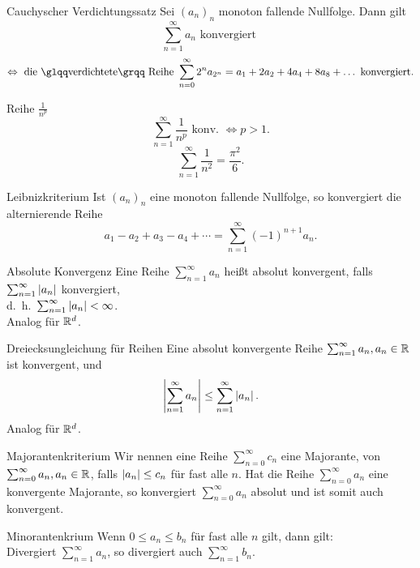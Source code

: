 \documentclass[main.tex]{subfiles}
\begin{document}
\begin{karte}{Cauchyscher Verdichtungssatz}
    Sei \({(a_n)}_n\) monoton fallende 
    Nullfolge. Dann gilt
    \[\sum_{n=1}^{\infty} a_n 
    \text{ konvergiert }\]
    \[\Leftrightarrow \text{ die 
    \gqq{verdichtete} Reihe } 
    \sum_{n=0}^{\infty}2^n a_{2^n} 
    = a_1 + 2a_2 + 4a_4 + 8 a_8 
    + \dots \text{ konvergiert}.\]
\end{karte}
\begin{karte}{Reihe \( \frac{1}{n^p} \)}
    \[ \sum_{n=1}^{\infty} 
    \frac{1}{n^p} \text{ konv. } 
    \Leftrightarrow p>1. \]
    \[ \sum_{n=1}^{\infty} \frac{1}{n^2} 
    = \frac{\pi^2}{6}. \]
\end{karte}
\begin{karte}{Leibnizkriterium}
    Ist \( {(a_n)}_n \) eine monoton 
    fallende Nullfolge, so konvergiert 
    die alternierende Reihe
    \[ a_1 - a_2 + a_3 - a_4 + \cdots 
    = \sum_{n=1}^{\infty} {(-1)}^{n+1} a_n. \]
\end{karte}
\begin{karte}{Absolute Konvergenz}
    Eine Reihe \( \sum_{n=1}^{\infty} a_n \) 
    heißt absolut konvergent, falls 
    \( \sum_{n=1}^{\infty} \left| a_n \right| \) 
    konvergiert,\\ 
    d.\ h.\  \(\sum_{n=1}^{\infty} \left| a_n \right| < \infty \).\\
    Analog für \(\mathbb{R}^d\).
\end{karte}
\begin{karte}{Dreiecksungleichung für Reihen}
    Eine absolut konvergente Reihe 
    \( \sum_{n=1}^{\infty}a_n, a_n \in\mathbb{R} \) 
    ist konvergent, und
\[ \left|  \sum_{n=1}^{\infty}a_n  \right|
    \leq \sum_{n=1}^{\infty}\left| a_n \right|.\]
    Analog für \( \mathbb{R}^d \).
\end{karte}
\begin{karte}{Majorantenkriterium}
    Wir nennen eine Reihe 
    \( \sum_{n=0}^{\infty} c_n \) 
    eine Majorante, von \( \sum_{n=0}^{\infty}
    a_n, a_n\in\mathbb{R} \), falls \( \left| a_n \right| 
    \leq c_n \) für fast alle \(n\).
    Hat die Reihe \( \sum_{n=0}^{\infty}a_n \) 
    eine konvergente Majorante, so konvergiert 
    \( \sum_{n=0}^{\infty}a_n \) absolut und 
    ist somit auch konvergent.
\end{karte}
\begin{karte}{Minorantenkrium}
    Wenn \( 0 \leq a_n \leq b_n \) für fast alle \( n \) 
    gilt, dann gilt:\\
    Divergiert \( \sum_{n=1}^\infty a_n \), so 
    divergiert auch \( \sum_{n=1}^\infty b_n \).
\end{karte}
\end{document}
